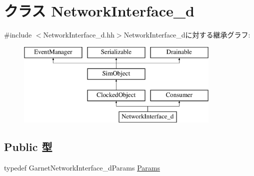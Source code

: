 \hypertarget{classNetworkInterface__d}{
\section{クラス NetworkInterface\_\-d}
\label{classNetworkInterface__d}
}


{\ttfamily \#include $<$NetworkInterface\_\-d.hh$>$}NetworkInterface\_\-dに対する継承グラフ:\begin{figure}[H]
\begin{center}
\leavevmode
\includegraphics[height=4cm]{classNetworkInterface__d}
\end{center}
\end{figure}
\subsection*{Public 型}
\begin{DoxyCompactItemize}
\item 
typedef GarnetNetworkInterface\_\-dParams \hyperlink{classNetworkInterface__d_ab6c40ec3be0502fd09ea61583eecc26a}{Params}
\end{DoxyCompactItemize}
